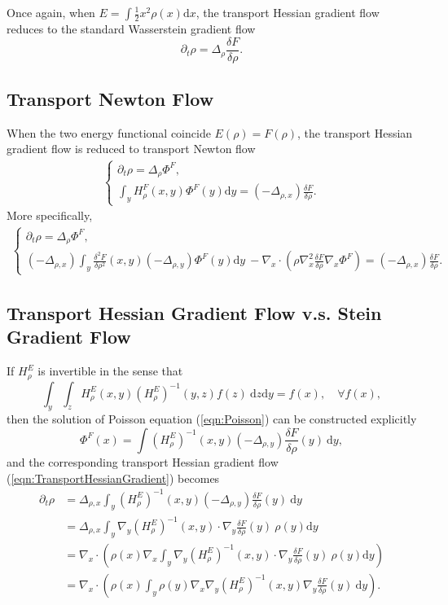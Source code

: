 \documentclass[11pt]{book}
\begin{document}
Once again, when $E = \int \frac{1}{2}x^2 \rho(x)\text{d}x$, the transport Hessian gradient flow reduces to the standard Wasserstein gradient flow
\[
\partial_t \rho = \Delta_{\rho}\frac{\delta F}{\delta\rho}.
\]


\subsection{Transport Newton Flow}

When the two energy functional coincide $E(\rho) = F(\rho)$, the transport Hessian gradient flow is reduced to transport Newton flow
\begin{align}\label{eqn:TransportNewton}
\begin{cases}
\partial_t \rho = \Delta_{\rho}\Phi^F, \\
\int_y H^F_{\rho}(x,y) \Phi^F(y)\text{d}y = (-\Delta_{\rho,x})\frac{\delta F}{\delta\rho}.
\end{cases}
\end{align}
More specifically, 
\begin{align}\label{eqn:TransportNewton2}
\begin{cases}
\partial_t \rho = \Delta_{\rho}\Phi^F, \\
(-\Delta_{\rho,x}) \int_y \frac{\delta^2 F}{\delta\rho^2}(x,y)(-\Delta_{\rho,y})\Phi^F(y)\text{d}y\ -  \nabla_x\cdot\left(\rho\nabla_x^2\frac{\delta F}{\delta \rho}\nabla_x\Phi^F\right) =  (-\Delta_{\rho,x})\frac{\delta F}{\delta\rho}.
\end{cases}
\end{align}


\subsection{Transport Hessian Gradient Flow v.s. Stein Gradient Flow}

If $H^E_{\rho}$ is invertible in the sense that 
\[
\int_y \int_z H^E_{\rho}(x,y) (H^E_{\rho})^{-1}(y,z)f(z) \ \text{d}z\text{d}y = f(x), \quad \forall f(x),
\]
then the solution of Poisson equation (\ref{eqn:Poisson}) can be constructed explicitly
\[
\Phi^F(x) = \int (H^E_{\rho})^{-1} (x,y) (-\Delta_{\rho,y}) \frac{\delta F}{\delta \rho}(y) \ \text{d}y,
\]
and the corresponding transport Hessian gradient flow (\ref{eqn:TransportHessianGradient}) becomes
\begin{align}
\partial_t\rho &= \Delta_{\rho,x}\int_y (H^E_{\rho})^{-1} (x,y) (-\Delta_{\rho,y}) \frac{\delta F}{\delta \rho}(y) \ \text{d}y \nonumber\\
& =  \Delta_{\rho,x}\int_y \nabla_y(H^E_{\rho})^{-1} (x,y) \cdot \nabla_y \frac{\delta F}{\delta \rho}(y)  \ \rho(y)\text{d}y \nonumber\\
& = \nabla_x\cdot \left( \rho(x) \nabla_x \int_y \nabla_y(H^E_{\rho})^{-1} (x,y) \cdot \nabla_y \frac{\delta F}{\delta \rho}(y)  \ \rho(y)\text{d}y  \right)  \nonumber \\
& = \nabla_x \cdot \left( \rho(x) \int_y \rho(y) \nabla_x\nabla_y (H^E_{\rho})^{-1}(x,y) \nabla_y \frac{\delta F}{\delta \rho}(y) \ \text{d}y \right). \label{eqn:TransportHessianGradient_Explicit}
\end{align}
\end{document}
